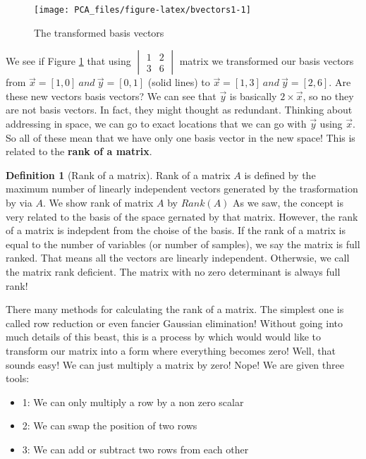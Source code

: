 \documentclass[
]{book}
\providecommand{\tightlist}{%
  \setlength{\itemsep}{0pt}\setlength{\parskip}{0pt}}
\theoremstyle{definition}
\newtheorem{definition}{Definition}[chapter]
\theoremstyle{definition}
\theoremstyle{definition}
\theoremstyle{remark}
\begin{document}
\begin{figure}

{\centering \texttt{[image: PCA\_files/figure-latex/bvectors1-1]} 

}

\caption{The transformed basis vectors}\label{fig:bvectors1}
\end{figure}

We see if Figure \ref{fig:bvectors1} that using \(\begin{vmatrix} 1&2\\3&6 \end{vmatrix}\) matrix we transformed our basis vectors from \(\vec{x}=[1,0] \ and \ \vec{y}=[0,1]\) (solid lines) to \(\vec{x}=[1,3] \ and \ \vec{y}=[2,6]\). Are these new vectors basis vectors? We can see that \(\vec{y}\) is basically \(2 \times \vec{x}\), so no they are not basis vectors. In fact, they might thought as redundant. Thinking about addressing in space, we can go to exact locations that we can go with \(\vec{y}\) using \(\vec{x}\). So all of these mean that we have only one basis vector in the new space! This is related to the \textbf{rank of a matrix}.

\begin{definition}[Rank of a matrix]
\protect\hypertarget{def:matrixr}{}{\label{def:matrixr} \iffalse (Rank of a matrix) \fi{} }Rank of a matrix \(A\) is defined by the maximum number of linearly independent vectors generated by the trasformation by via \(A\). We show rank of matrix \(A\) by \(Rank(A)\) As we saw, the concept is very related to the basis of the space gernated by that matrix. However, the rank of a matrix is indepdent from the choise of the basis. If the rank of a matrix is equal to the number of variables (or number of samples), we say the matrix is full ranked. That means all the vectors are linearly independent. Otherwsie, we call the matrix rank deficient. The matrix with no zero determinant is always full rank!
\end{definition}

There many methods for calculating the rank of a matrix. The simplest one is called row reduction or even fancier Gaussian elimination! Without going into much details of this beast, this is a process by which would would like to transform our matrix into a form where everything becomes zero! Well, that sounds easy! We can just multiply a matrix by zero! Nope! We are given three tools:

\begin{itemize}
\tightlist
\item
  1: We can only multiply a row by a non zero scalar
\item
  2: We can swap the position of two rows
\item
  3: We can add or subtract two rows from each other
\end{itemize}
\end{document}
